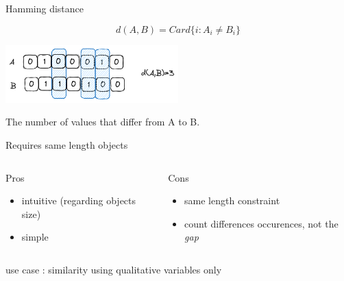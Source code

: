 \documentclass{beamer}
\begin{document}
\begin{frame}{Hamming distance}

$$d(A,B)= Card\{i : A_i \neq B_i\}$$

\begin{center}
\includegraphics[width=0.5\textwidth,keepaspectratio]{img/hamming.png}
\end{center}

\begin{scriptsize}
The number of values that differ from A to B.


Requires \alert{same length} objects



\begin{columns}[T,onlytextwidth]
\begin{block}{Pros}
\begin{itemize}
  \item intuitive (regarding objects size)
  \item simple 
\end{itemize}
\end{block}
\begin{block}{Cons}
\begin{spacing}{0.9}
\begin{itemize}
  \item same length constraint
  \item count differences occurences, not the \textit{gap}  
\end{itemize}
\end{spacing}
\end{block}
\end{columns}
\end{scriptsize}

use case : similarity using qualitative variables only

\end{frame}
\end{document}
